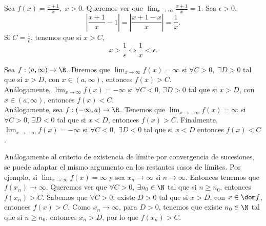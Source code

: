 \begin{eg}
\normalfont Sea $\displaystyle f\left(x\right) = \frac{x+1}{x}, \; x > 0 $. Queremos ver que $\displaystyle \lim_{x \to \infty}\frac{x+1}{x}=1 $. Sea $\displaystyle \epsilon > 0 $, 
\[ \left|\frac{x+1}{x}-1\right| = \left|\frac{x+1-x}{x}\right| =\frac{1}{x}  .\]
Si $\displaystyle C = \frac{1}{\epsilon } $, tenemos que si $\displaystyle x > C $, 
\[x > \frac{1}{\epsilon } \iff \frac{1}{x} < \epsilon  .\]
\end{eg}

\begin{fdefinition}[]
\normalfont Sea $\displaystyle f: \left(a, \infty\right) \to \R $. Diremos que $\displaystyle \lim_{x \to \infty}f\left(x\right) = \infty $ si $\displaystyle \forall C > 0, \; \exists D > 0 $ tal que si $\displaystyle x > D $, con $\displaystyle x \in \left(a, \infty\right) $, entonces $\displaystyle f\left(x\right) > C $. \\
Análogamente, $\displaystyle \lim_{x \to \infty}f\left(x\right) = -\infty $ si $\displaystyle \forall C < 0 $, $\displaystyle \exists D > 0 $ tal que si $\displaystyle x > D $, con $\displaystyle x \in \left(a, \infty\right) $, entonces $\displaystyle f\left(x\right) < C $. \\
Análogamente, sea $\displaystyle f: \left(-\infty, a\right)\to \R $. Tenemos que $\displaystyle \lim_{x \to -\infty}f\left(x\right) = \infty $ si $\displaystyle \forall C > 0 $, $\displaystyle \exists D < 0 $ tal que si $\displaystyle x < D $, entonces $\displaystyle f\left(x\right) > C $. Finalmente, $\displaystyle \lim_{x \to -\infty}f\left(x\right)=-\infty $ si $\displaystyle \forall C < 0, \; \exists D < 0 $ tal que si $\displaystyle x < D $ entonces $\displaystyle f\left(x\right) < C $. 
\end{fdefinition}

\begin{observation}
\normalfont Análogamente al criterio de existencia de límite por convergencia de sucesiones, se puede adaptar el mismo argumento en los restantes casos de límites. Por ejemplo, si $\displaystyle \lim_{x \to \infty}f\left(x\right) = \infty $ y sea $\displaystyle x_{n} \to \infty $ si $\displaystyle n \to \infty $. Entonces tenemos que $\displaystyle f\left(x_{n}\right)\to \infty $. Queremos ver que $\displaystyle \forall C > 0 $, $\displaystyle \exists n_{0} \in \N $ tal que si $\displaystyle n \geq n_{0} $, entonces $\displaystyle f\left(x_{n}\right) > C $. Sabemos que $\displaystyle \forall C>0 $, existe $\displaystyle D > 0 $ tal que si $\displaystyle x > D $, con $\displaystyle x \in \dom f $, entonces $\displaystyle f\left(x\right) > C $. Como $\displaystyle x_{n}\to \infty$, para $\displaystyle D > 0 $, tenemos que existe $\displaystyle n_{0}\in\N $ tal que si $\displaystyle n \geq n_{0} $, entonces $\displaystyle x_{n} > D $, por lo que $\displaystyle f\left(x_{n}\right) > C $. 
\end{observation}

